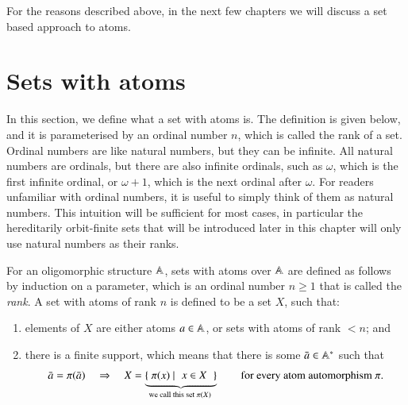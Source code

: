 For the reasons described above, in the next few chapters we will discuss a set based approach to atoms. 


\section{Sets with atoms}
\label{sec:sets-with-atoms}

In this section, we define what a set with atoms is. The definition is given below, and it is parameterised by an ordinal number $n$, which is called the rank of a set. Ordinal numbers are like natural numbers, but they can be infinite. All natural numbers are ordinals, but there are also infinite ordinals, such as $\omega$, which is the first infinite ordinal, or $\omega+1$, which is the next ordinal after $\omega$. For readers unfamiliar with ordinal numbers, it is useful to simply think of them as natural numbers. This intuition will be sufficient for most cases, in particular the hereditarily orbit-finite sets that will be introduced later in this chapter will only use natural numbers as their ranks. 



\begin{definition}
\label{def:sets-with-atoms}
For an  oligomorphic structure $\mathbb A$, sets with atoms over $\mathbb A$ are defined as follows by induction on a  parameter, which is an ordinal number $n \ge 1$ that is called the \emph{rank}.  A set with atoms of rank $n$ is defined to be a set $X$, such that: 
\begin{enumerate}
	\item \label{item:set-with-atoms-recursive} elements of $X$ are either atoms $a \in \mathbb A$, or  sets with atoms of rank $<n$; and 
	\item \label{item:set-with-atoms-finite-support} there is a finite support, which means that there is some $\bar a \in \mathbb A^*$ such that
	 \begin{align*}
		\bar a = \pi(\bar a)
		\quad \Rightarrow \quad 
		X = \myunderbrace{\setbuild{ \pi(x)}{$x \in X$}}{we call this set $\pi(X)$} \qquad \text{for every atom automorphism $\pi$.}
		\end{align*}
\end{enumerate}
\end{definition}


